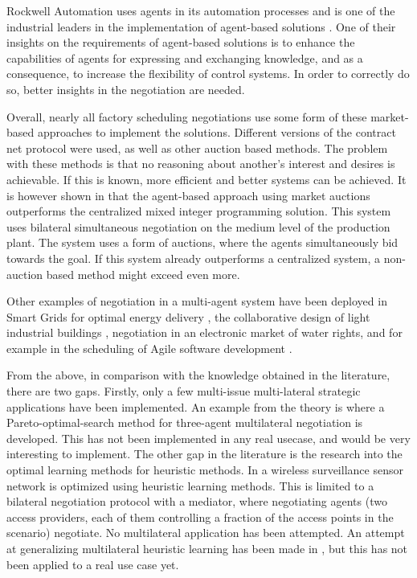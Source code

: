 
Rockwell Automation uses agents in its automation processes and is one of the industrial leaders in the implementation of agent-based solutions \citep{vrba2011rockwell}. One of their insights on the requirements of agent-based solutions is to enhance the capabilities of agents for expressing and exchanging knowledge, and as a consequence, to increase the flexibility of control systems. In order to correctly do so, better insights in the negotiation are needed.

Overall, nearly all factory scheduling negotiations use some form of these market-based approaches \citep{monostori2006agent} to implement the solutions. Different versions of the contract net protocol were used, as well as other auction based methods. The problem with these methods is that no reasoning about another's interest and desires is achievable. If this is known, more efficient and better systems can be achieved. It is however shown in \citep{bruccoleri2005production} that the agent-based approach using market auctions outperforms the centralized mixed integer programming solution. This system uses bilateral simultaneous negotiation on the medium level of the production plant. The system uses a form of auctions, where the agents simultaneously bid towards the goal. If this system already outperforms a centralized system, a non-auction based method might exceed even more.

Other examples of negotiation in a multi-agent system have been deployed in Smart Grids for optimal energy delivery \citep{pipattanasomporn2009multi}, the collaborative design of light industrial buildings \citep{anumba2003negotiation}, negotiation in an electronic market of water rights, and for example in the scheduling of Agile software development \citep{rabelo1999multi}.

From the above, in comparison with the knowledge obtained in the literature, there are two gaps. Firstly, only a few multi-issue multi-lateral strategic applications have been implemented. An example from the theory is \citet{wu2009efficient} where a Pareto-optimal-search method for three-agent multilateral negotiation is developed. This has not been implemented in any real usecase, and would be very interesting to implement. The other gap in the literature is the research into the optimal learning methods for heuristic methods. In \citep{de2015automated} a wireless surveillance sensor network is optimized using heuristic learning methods. This is limited to a bilateral negotiation protocol with a mediator, where negotiating agents (two access providers, each of them controlling a fraction of the access points in the scenario) negotiate. No multilateral application has been attempted. An attempt at generalizing multilateral heuristic learning has been made in \citet{beheshti2014homan}, but this has not been applied to a real use case yet. 

